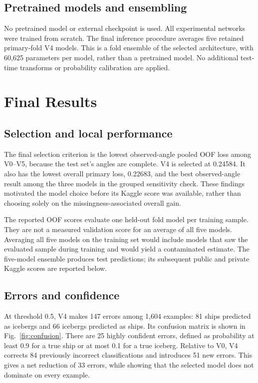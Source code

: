\documentclass[journal]{IEEEtran}
\begin{document}
\subsection{Pretrained models and ensembling}
No pretrained model or external checkpoint is used. All experimental networks were trained from scratch. The final inference procedure averages five retained primary-fold V4 models. This is a fold ensemble of the selected architecture, with 60,625 parameters per model, rather than a pretrained model. No additional test-time transforms or probability calibration are applied.

\section{Final Results}
\subsection{Selection and local performance}
The final selection criterion is the lowest observed-angle pooled OOF loss among V0--V5, because the test set's angles are complete. V4 is selected at 0.24584. It also has the lowest overall primary loss, 0.22683, and the best observed-angle result among the three models in the grouped sensitivity check. These findings motivated the model choice before its Kaggle score was available, rather than choosing solely on the missingness-associated overall gain.

The reported OOF scores evaluate one held-out fold model per training sample. They are not a measured validation score for an average of all five models. Averaging all five models on the training set would include models that saw the evaluated sample during training and would yield a contaminated estimate. The five-model ensemble produces test predictions; its subsequent public and private Kaggle scores are reported below.

\subsection{Errors and confidence}
At threshold 0.5, V4 makes 147 errors among 1,604 examples: 81 ships predicted as icebergs and 66 icebergs predicted as ships. Its confusion matrix is shown in Fig.~\ref{fig:confusion}. There are 25 highly confident errors, defined as probability at least 0.9 for a true ship or at most 0.1 for a true iceberg. Relative to V0, V4 corrects 84 previously incorrect classifications and introduces 51 new errors. This gives a net reduction of 33 errors, while showing that the selected model does not dominate on every example.
\end{document}

